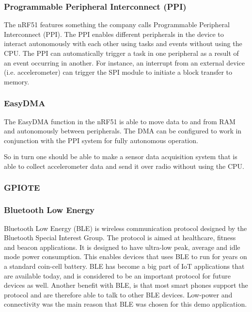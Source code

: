 \subsubsection{Programmable Peripheral Interconnect (PPI)}

The nRF51 features something the company calls Programmable Peripheral Interconnect (PPI). The PPI enables different peripherals in the device to interact autonomously with each other using tasks and events without using the CPU. The PPI can automatically trigger a task in one peripheral as a result of an event occurring in another. For instance, an interrupt from an external device (i.e. accelerometer) can trigger the SPI module to initiate a block transfer to memory. 

\subsubsection{EasyDMA}

The EasyDMA function in the nRF51 is able to move data to and from RAM and autonomously between peripherals. The DMA can be configured to work in conjunction with the PPI system for fully autonomous operation.

So in turn one should be able to make a sensor data acquisition system that is able to collect accelerometer data and send it over radio without using the CPU.

\subsubsection{GPIOTE}

\subsubsection{Bluetooth Low Energy}

Bluetooth Low Energy (BLE) is wireless communication protocol designed by the Bluetooth Special Interest Group. The protocol is aimed at healthcare, fitness and beacon applications. It is designed to have ultra-low peak, average and idle mode power consumption. This enables devices that uses BLE to run for years on a standard coin-cell battery. BLE has become a big part of IoT applications that are available today, and is considered to be an important protocol for future devices as well. Another benefit with BLE, is that most smart phones support the protocol and are therefore able to talk to other BLE devices. Low-power and connectivity was the main reason that BLE was chosen for this demo application. 

